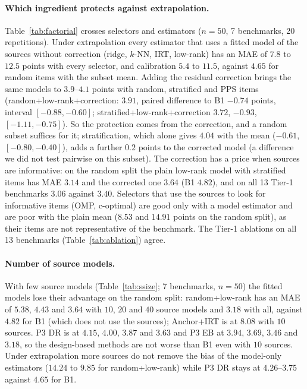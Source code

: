 \paragraph{Which ingredient protects against extrapolation.}
Table~\ref{tab:factorial} crosses selectors and estimators ($n{=}50$, 7 benchmarks, 20 repetitions). Under extrapolation every estimator that uses a fitted model of the sources without correction (ridge, $k$-NN, IRT, low-rank) has an MAE of $7.8$ to $12.5$ points with every selector, and calibration $5.4$ to $11.5$, against $4.65$ for random items with the subset mean. Adding the residual correction brings the same models to $3.9$--$4.1$ points with random, stratified and PPS items (random+low-rank+correction: $3.91$, paired difference to B1 $-0.74$ points, interval $[-0.88,-0.60]$; stratified+low-rank+correction $3.72$, $-0.93$, $[-1.11,-0.75]$). So the protection comes from the correction, and a random subset suffices for it; stratification, which alone gives $4.04$ with the mean ($-0.61$, $[-0.80,-0.40]$), adds a further $0.2$ points to the corrected model (a difference we did not test pairwise on this subset). The correction has a price when sources are informative: on the random split the plain low-rank model with stratified items has MAE $3.14$ and the corrected one $3.64$ (B1 $4.82$), and on all 13 Tier-1 benchmarks $3.06$ against $3.40$. Selectors that use the sources to look for informative items (OMP, c-optimal) are good only with a model estimator and are poor with the plain mean ($8.53$ and $14.91$ points on the random split), as their items are not representative of the benchmark. The Tier-1 ablations on all 13 benchmarks (Table~\ref{tab:ablation}) agree.

\paragraph{Number of source models.}
With few source models (Table~\ref{tab:ssize}; 7 benchmarks, $n{=}50$) the fitted models lose their advantage on the random split: random+low-rank has an MAE of $5.38$, $4.43$ and $3.64$ with $10$, $20$ and $40$ source models and $3.18$ with all, against $4.82$ for B1 (which does not use the sources); Anchor+IRT is at $8.08$ with $10$ sources. P3 DR is at $4.15$, $4.00$, $3.87$ and $3.63$ and P3 EB at $3.94$, $3.69$, $3.46$ and $3.18$, so the design-based methods are not worse than B1 even with $10$ sources. Under extrapolation more sources do not remove the bias of the model-only estimators ($14.24$ to $9.85$ for random+low-rank) while P3 DR stays at $4.26$--$3.75$ against $4.65$ for B1.

